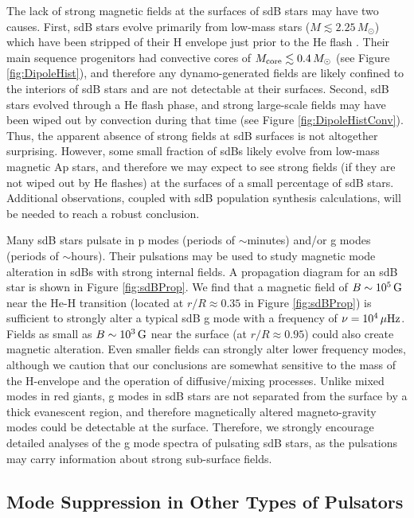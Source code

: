 The lack of strong magnetic fields at the surfaces of sdB stars may have two causes. First, sdB stars evolve primarily from low-mass stars ($M \lesssim 2.25 \, M_\odot$) which have been stripped of their H envelope just prior to the He flash \citep{heber_2009}. Their main sequence progenitors had convective cores of $M_{\rm core} \lesssim 0.4 \, M_\odot$ (see Figure \ref{fig:DipoleHist}), and therefore any dynamo-generated fields are likely confined to the interiors of sdB stars and are not detectable at their surfaces. Second, sdB stars evolved through a He flash phase, and strong large-scale fields may have been wiped out by convection during that time (see Figure \ref{fig:DipoleHistConv}). Thus, the apparent absence of strong fields at sdB surfaces is not altogether surprising. However, some small fraction of sdBs likely evolve from low-mass magnetic Ap stars, and therefore we may expect to see strong fields (if they are not wiped out by He flashes) at the surfaces of a small percentage of sdB stars. Additional observations, coupled with sdB population synthesis calculations, will be needed to reach a robust conclusion.

Many sdB stars pulsate in p modes (periods of $\sim$minutes) and/or g modes (periods of $\sim$hours). Their pulsations may be used to study magnetic mode alteration in sdBs with strong internal fields. A propagation diagram for an sdB star is shown in Figure \ref{fig:sdBProp}. We find that a magnetic field of $B\sim 10^5 \, {\rm G}$ near the He-H transition (located at $r/R \approx 0.35$ in Figure \ref{fig:sdBProp}) is sufficient to strongly alter a typical sdB g mode with a frequency of $\nu = 10^4 \, \mu {\rm Hz}$. Fields as small as $B\sim 10^3 \, {\rm G}$ near the surface (at $r/R \approx 0.95$) could also create magnetic alteration. Even smaller fields can strongly alter lower frequency modes, although we caution that our conclusions are somewhat sensitive to the mass of the H-envelope and the operation of diffusive/mixing processes. Unlike mixed modes in red giants, g modes in sdB stars are not separated from the surface by a thick evanescent region, and therefore magnetically altered magneto-gravity modes could be detectable at the surface. Therefore, we strongly encourage detailed analyses of the g mode spectra of pulsating sdB stars, as the pulsations may carry information about strong sub-surface fields. 



\subsection{Mode Suppression in Other Types of Pulsators}
  
